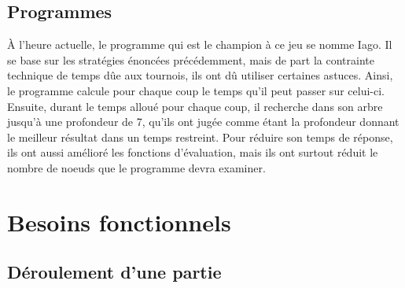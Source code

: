 \documentclass[10pt,a4paper]{article}
\begin{document}
\subsection{Programmes}

À l'heure actuelle, le programme qui est le champion à ce jeu se nomme Iago. Il se base sur les stratégies énoncées précédemment, mais de part la contrainte technique de temps dûe aux tournois, ils ont dû utiliser certaines astuces. Ainsi, le programme calcule pour chaque coup le temps qu'il peut passer sur celui-ci. Ensuite, durant le temps alloué pour chaque coup, il recherche dans son arbre jusqu'à une profondeur de 7, qu'ils ont jugée comme étant la profondeur donnant le meilleur résultat dans un temps restreint. Pour réduire son temps de réponse, ils ont aussi amélioré les fonctions d'évaluation, mais ils ont surtout réduit le nombre de noeuds que le programme devra examiner.
\newpage

\section{Besoins fonctionnels}
\label{sec:besoins_fonctionnels}

\subsection {Déroulement d'une partie}
\label{sec:deroulement_partie}
\end{document}
